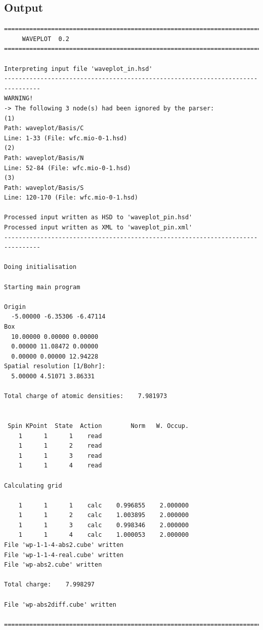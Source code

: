 \subsection{Output}

\begin{verbatim}
================================================================================
     WAVEPLOT  0.2
================================================================================

Interpreting input file 'waveplot_in.hsd'
--------------------------------------------------------------------------------
WARNING!
-> The following 3 node(s) had been ignored by the parser:
(1)
Path: waveplot/Basis/C
Line: 1-33 (File: wfc.mio-0-1.hsd)
(2)
Path: waveplot/Basis/N
Line: 52-84 (File: wfc.mio-0-1.hsd)
(3)
Path: waveplot/Basis/S
Line: 120-170 (File: wfc.mio-0-1.hsd)

Processed input written as HSD to 'waveplot_pin.hsd'
Processed input written as XML to 'waveplot_pin.xml'
--------------------------------------------------------------------------------

Doing initialisation

Starting main program

Origin
  -5.00000 -6.35306 -6.47114
Box
  10.00000 0.00000 0.00000
  0.00000 11.08472 0.00000
  0.00000 0.00000 12.94228
Spatial resolution [1/Bohr]:
  5.00000 4.51071 3.86331

Total charge of atomic densities:    7.981973


 Spin KPoint  State  Action        Norm   W. Occup.
    1      1      1    read
    1      1      2    read
    1      1      3    read
    1      1      4    read

Calculating grid

    1      1      1    calc    0.996855    2.000000
    1      1      2    calc    1.003895    2.000000
    1      1      3    calc    0.998346    2.000000
    1      1      4    calc    1.000053    2.000000
File 'wp-1-1-4-abs2.cube' written
File 'wp-1-1-4-real.cube' written
File 'wp-abs2.cube' written

Total charge:    7.998297

File 'wp-abs2diff.cube' written

================================================================================
\end{verbatim}

